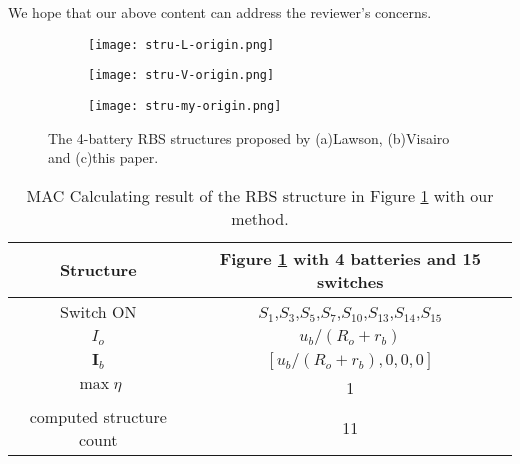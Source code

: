 \begin{revresponse}
We hope that our above content can address the reviewer's concerns.

\begin{figure}[htbp]
    \centering
    \begin{subfigure}[b]{0.2\textwidth}
        \texttt{[image: stru-L-origin.png]}
        \caption{}
        \label{fig:study-stru-Lawson}
    \end{subfigure}
    \hspace{0.02\textwidth}
    \begin{subfigure}[b]{0.4\textwidth}
        \texttt{[image: stru-V-origin.png]}
        \caption{}
        \label{fig:study-stru-Visairo}
    \end{subfigure}
    \hspace{0.02\textwidth}
    \begin{subfigure}[b]{0.31\textwidth}
        \texttt{[image: stru-my-origin.png]}
        \caption{}
        \label{fig:study-stru-my}
    \end{subfigure}
    \caption{The 4-battery RBS structures proposed by (a)Lawson\cite{lawsonSoftwareConfigurableBattery2012}, (b)Visairo\cite{visairoReconfigurableBatteryPack2008} and (c)this paper.}
\end{figure}

\begin{table}[htbp]
  \centering
    \caption{MAC Calculating result of the RBS structure in Figure \ref{fig:study-stru-Lawson} with our method.}
    \begin{tabular}{cc}
    \toprule
        Structure & Figure \ref{fig:study-stru-Lawson} with 4 batteries and 15 switches  \\
    \midrule
    Switch ON & $S_1$,$S_3$,$S_5$,$S_7$,$S_{10}$,$S_{13}$,$S_{14}$,$S_{15}$ \\
    $I_o$ & $u_b/(R_o+r_b)$ \\
    $\bm{I}_b$ & $[u_b/(R_o+r_b),0,0,0]$ \\
    $\max  \eta$     & 1 \\
    computed structure count & 11 \\
    \bottomrule
    \end{tabular}
  \label{tab:study-results-Lawson-greedy}
\end{table}


\end{revresponse}
